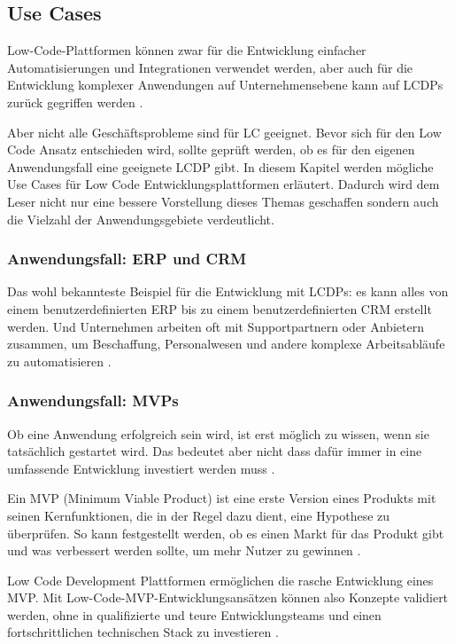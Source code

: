 \documentclass[12pt]{article} %
\begin{document}
	\subsection{Use Cases}	
	Low-Code-Plattformen können zwar für die Entwicklung einfacher Automatisierungen und Integrationen verwendet werden, aber auch für die Entwicklung komplexer Anwendungen auf Unternehmensebene kann auf LCDPs zurück gegriffen werden \autocite{KevinShuler.2023}. 
	
	Aber nicht alle Geschäftsprobleme sind für LC geeignet. Bevor sich für den Low Code Ansatz entschieden wird, sollte geprüft werden, ob es für den eigenen Anwendungsfall eine geeignete LCDP gibt. In diesem Kapitel werden mögliche Use Cases für Low Code Entwicklungsplattformen erläutert. Dadurch wird dem Leser nicht nur eine bessere Vorstellung dieses Themas geschaffen sondern auch die Vielzahl der Anwendungsgebiete verdeutlicht.

	\subsubsection{Anwendungsfall: ERP und CRM}
	Das wohl bekannteste Beispiel für die Entwicklung mit LCDPs: es kann alles von einem benutzerdefinierten ERP bis zu einem benutzerdefinierten CRM erstellt werden. Und Unternehmen arbeiten oft mit Supportpartnern oder Anbietern zusammen, um Beschaffung, Personalwesen und andere komplexe Arbeitsabläufe zu automatisieren \autocite{KevinShuler.2023}.
	
	\subsubsection{Anwendungsfall: MVPs} \label{MVP}
	Ob eine Anwendung erfolgreich sein wird, ist erst möglich zu wissen, wenn sie tatsächlich gestartet wird. Das bedeutet aber nicht dass dafür immer in eine umfassende Entwicklung investiert werden muss \autocite{OleksiiGlib.2022}.
	
	Ein MVP (Minimum Viable Product) ist eine erste Version eines Produkts mit seinen Kernfunktionen, die in der Regel dazu dient, eine Hypothese zu überprüfen. So kann festgestellt werden, ob es einen Markt für das Produkt gibt und was verbessert werden sollte, um mehr Nutzer zu gewinnen \autocite{OleksiiGlib.2022}.
	
	Low Code Development Plattformen ermöglichen die rasche Entwicklung eines MVP. Mit Low-Code-MVP-Entwicklungsansätzen können also Konzepte validiert werden, ohne in qualifizierte und teure Entwicklungsteams und einen fortschrittlichen technischen Stack zu investieren \autocite{OleksiiGlib.2022}.
	
\end{document}
